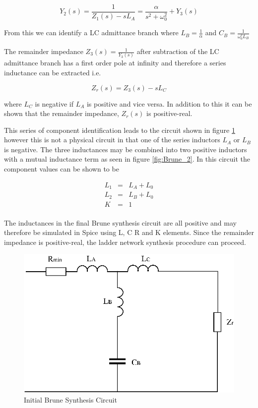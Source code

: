 \begin{equation} \label{eq:brune_3}
Y_2\left(s\right)=\frac{1}{Z_1\left(s\right)-sL_A}=\frac{\alpha}{s^2+\omega_0^2}+Y_3\left(s\right)
\end{equation}

From this we can identify a LC admittance branch where $L_B=\frac{1}{\alpha}$ and $C_B=\frac{1}{\omega_0^2 L_B}$

The remainder impedance $Z_3\left(s\right)=\frac{1}{Y_3\left(s\right)}$ after subtraction of the LC admittance branch has a first order pole at infinity and therefore a series inductance can be extracted i.e. 

\begin{equation} \label{eq:brune_4}
Z_r\left(s\right)=Z_3\left(s\right)-sL_C
\end{equation}

where $L_C$ is negative if $L_A$ is positive and vice versa. In addition to this it can be shown that the remainder impedance, $Z_r(s)$ is positive-real.

This series of component identification leads to the circuit shown in figure \ref{fig:Brune_1} however this is not a physical circuit in that one of the series inductors $L_A$ or $L_B$ is negative. The three inductances may be combined into two positive inductors with a mutual inductance term as seen in figure \ref{fig:Brune_2}. In this circuit the component values can be shown to be

\begin{equation} \label{eq:brune_5}
\begin{array}{rcl}
L_1 & = & L_A+L_0 \\
L_2 & = & L_B+L_0\\
K & = & 1\\
\end{array}
\end{equation}

The inductances in the final Brune synthesis circuit are all positive and may therefore be simulated in Spice using L, C R and K elements. Since the remainder impedance is positive-real, the ladder network synthesis procedure can proceed.

\begin{figure}[ht]
\centering
\includegraphics[scale=0.7]{./Imgs/Brune_1.eps}
\caption{Initial Brune Synthesis Circuit}
\label{fig:Brune_1}
\end{figure}
%

